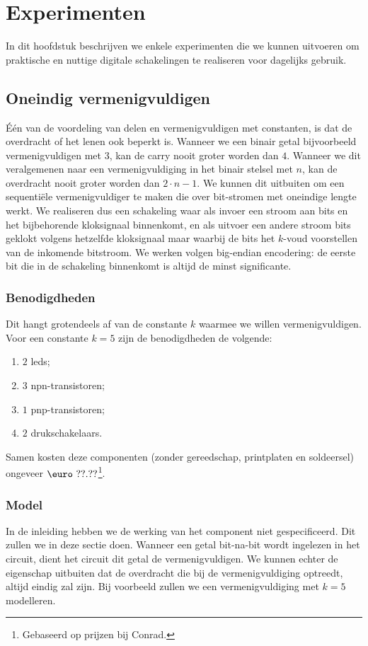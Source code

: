 \chapter{Experimenten}
\begin{chapterintro}
In dit hoofdstuk beschrijven we enkele experimenten die we kunnen uitvoeren om praktische en nuttige digitale schakelingen te realiseren voor dagelijks gebruik.
\end{chapterintro}
\minitoc[n]
\section{Oneindig vermenigvuldigen}
\'E\'en van de voordeling van delen en vermenigvuldigen met constanten, is dat de overdracht of het lenen ook beperkt is. Wanneer we een binair getal bijvoorbeeld vermenigvuldigen met $3$, kan de carry nooit groter worden dan $4$. Wanneer we dit veralgemenen naar een vermenigvuldiging in het binair stelsel met $n$, kan de overdracht nooit groter worden dan $2\cdot n-1$. We kunnen dit uitbuiten om een sequenti\"ele vermenigvuldiger te maken die over bit-stromen met oneindige lengte werkt. We realiseren dus een schakeling waar als invoer een stroom aan bits en het bijbehorende kloksignaal binnenkomt, en als uitvoer een andere stroom bits geklokt volgens hetzelfde kloksignaal maar waarbij de bits het $k$-voud voorstellen van de inkomende bitstroom. We werken volgen big-endian encodering: de eerste bit die in de schakeling binnenkomt is altijd de minst significante.
\subsection{Benodigdheden}
Dit hangt grotendeels af van de constante $k$ waarmee we willen vermenigvuldigen. Voor een constante $k=5$ zijn de benodigdheden de volgende:
\begin{enumerate}
 \item $2$ leds;
 \item $3$ npn-transistoren;
 \item $1$ pnp-transistoren;
 \item $2$ drukschakelaars.
\end{enumerate}
Samen kosten deze componenten (zonder gereedschap, printplaten en soldeersel) ongeveer $\mbox{\euro}\ ??.??$\footnote{Gebaseerd op prijzen bij Conrad.}.
\subsection{Model}
In de inleiding hebben we de werking van het component niet gespecificeerd. Dit zullen we in deze sectie doen. Wanneer een getal bit-na-bit wordt ingelezen in het circuit, dient het circuit dit getal de vermenigvuldigen. We kunnen echter de eigenschap uitbuiten dat de overdracht die bij de vermenigvuldiging optreedt, altijd eindig zal zijn. Bij voorbeeld zullen we een vermenigvuldiging met $k=5$ modelleren.
